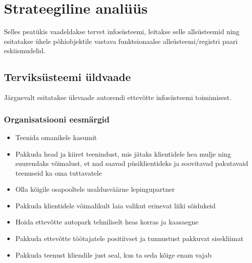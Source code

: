 \chapter{Strateegiline analüüs}
Selles peatükis vaadeldakse tervet infosüsteemi, leitakse selle allsüsteemid ning esitatakse ühele põhiobjektile vastava funktsionaalse allsüsteemi/registri paari eskiismudelid.

\section{Terviksüsteemi üldvaade}
Järgnevalt esitatakse ülevaade autorendi ettevõtte infosüsteemi toimimisest.

\subsection{Organisatsiooni eesmärgid}
\begin{itemize}
	\item Teenida omanikele kasumit
	\item Pakkuda head ja kiiret teenindust, mis jätaks klientidele hea mulje ning suurendaks võimalust, et nad saavad püsiklientideks ja soovitavad pakutavaid teenuseid ka oma tuttavatele
	\item Olla kõigile osapooltele usaldusväärne lepingupartner
	\item Pakkuda klientidele võimalikult laia valikut erinevat liiki sõidukeid
	\item Hoida ettevõtte autopark tehniliselt heas korras ja kaasaegne
	\item Pakkuda ettevõtte töötajatele positiivset ja tunnustust pakkuvat sisekliimat
	\item Pakkuda teenust kliendile just seal, kus ta seda kõige enam vajab
\end{itemize}

